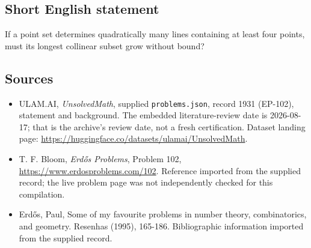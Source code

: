 \documentclass[11pt,a4paper]{article}
\begin{document}
\subsection{Short English statement}

If a point set determines quadratically many lines containing at least four points, must its longest collinear subset grow without bound?

\subsection{Sources}

{\small

\begin{itemize}

\item[\hypertarget{source:1931:1}{S1}] ULAM.AI, \emph{UnsolvedMath}, supplied \texttt{problems.json}, record 1931 (EP-102), statement and background. The embedded literature-review date is 2026-08-17; that is the archive’s review date, not a fresh certification. Dataset landing page: \url{https://huggingface.co/datasets/ulamai/UnsolvedMath}.

\item[\hypertarget{source:1931:2}{S2}] T. F. Bloom, \emph{Erdős Problems}, Problem 102, \url{https://www.erdosproblems.com/102}. Reference imported from the supplied record; the live problem page was not independently checked for this compilation.

\item[\hypertarget{source:1931:3}{S3}] Erd\H{o}s, Paul, Some of my favourite problems in number theory, combinatorics, and geometry. Resenhas (1995), 165-186. Bibliographic information imported from the supplied record.

\end{itemize}

}

\label{end:1931}
\end{document}
